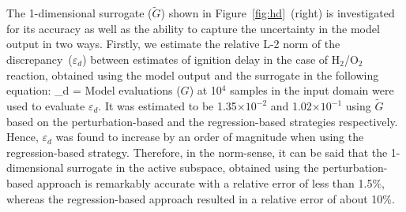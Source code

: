 The 1-dimensional surrogate ($\tilde{G}$) shown in Figure~\ref{fig:hd}~(right) is investigated
for its accuracy as well as the ability to capture the uncertainty in the
model output in two ways. Firstly, we estimate the relative L-2 norm of the discrepancy~($\varepsilon_d$)
between estimates of ignition delay in the case of H$_2$/O$_2$ reaction, obtained using the 
model output and the surrogate in the following equation:
%
\be
\varepsilon_d = 
\ee
%
Model evaluations ($G$) at 10$^{4}$ samples in the input domain were used to evaluate $\varepsilon_d$. 
It was estimated to be 1.35$\times10^{-2}$ and 1.02$\times10^{-1}$
using $\tilde{G}$ based on the perturbation-based and the regression-based strategies respectively. Hence,
$\varepsilon_d$ was found to increase by an order of magnitude when using the regression-based strategy.
Therefore, in the norm-sense, it can be said that the 1-dimensional surrogate in the active subspace, obtained
using the perturbation-based approach is remarkably accurate with a relative error of less than 1.5$\%$, whereas
the regression-based approach resulted in a relative error of about 10$\%$.


